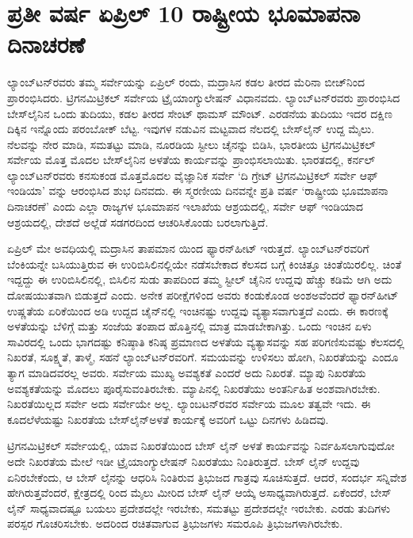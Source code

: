 
\chapter{ಪ್ರತೀ ವರ್ಷ ಏಪ್ರಿಲ್​ 10 ರಾಷ್ಟ್ರೀಯ ಭೂಮಾಪನಾ ದಿನಾಚರಣೆ}

ಲ್ಯಾಂಬ್​ಟನ್​ರವರು ತಮ್ಮ ಸರ್ವೇಯನ್ನು  ಏಪ್ರಿಲ್​  ರಂದು, ಮದ್ರಾಸಿನ ಕಡಲ ತೀರದ ಮೆರಿನಾ ಬೀಚ್​ನಿಂದ ಪ್ರಾರಂಭಿಸಿದರು. ಟ್ರಿಗನಮಿಟ್ರಿಕಲ್​ ಸರ್ವೇಯ ಟ್ರೈಯಾಂಗ್ಯುಲೇಷನ್​ ವಿಧಾನವದು. ಲ್ಯಾಂಬ್​ಟನ್​ರವರು ಪ್ರಾರಂಭಿಸಿದ ಬೇಸ್​ಲೈನಿನ ಒಂದು ತುದಿಯು, ಕಡಲ ತೀರದ ಸೇಂಟ್​ ಥಾಮಸ್​ ಮೌಂಟ್​. ಎರಡನೆಯ ತುದಿಯು ಇದರ ದಕ್ಷಿಣ ದಿಕ್ಕಿನ ಇನ್ನೊಂದು ಪರಂಬೋಕ್​ ಬೆಟ್ಟ. ಇವುಗಳ ನಡುವಿನ ಮಟ್ಟವಾದ ನೆಲದಲ್ಲಿ ಬೇಸ್​ಲೈನ್​ ಉದ್ದ  ಮೈಲು. ನೆಲವನ್ನು ನೇರ ಮಾಡಿ, ಸಮತಟ್ಟು ಮಾಡಿ, ನೂರಡಿಯ ಸ್ಟೀಲು ಚೈನನ್ನು ಬಿಡಿಸಿ, ಭಾರತೀಯ ಟ್ರಿಗನಮಿಟ್ರಿಕಲ್​ ಸರ್ವೇಯ ಮೊತ್ತ ಮೊದಲ ಬೇಸ್​ಲೈನಿನ ಅಳತೆಯ ಕಾರ್ಯವನ್ನು ಪ್ರಾಂಭಿಸಲಾಯಿತು. ಭಾರತದಲ್ಲಿ, ಕರ್ನಲ್​ ಲ್ಯಾಂಬ್​ಟನ್​ರವರು ಕನಸುಕಂಡ ಮೊತ್ತಮೊದಲ ವೈಜ್ಞಾನಿಕ ಸರ್ವೇ ‘ದಿ ಗ್ರೇಟ್​ ಟ್ರಿಗನಮಿಟ್ರಿಕಲ್​ ಸರ್ವೇ ಆಫ್​ ಇಂಡಿಯಾ’ ವನ್ನು ಆರಂಭಿಸಿದ ಶುಭ ದಿನವದು. ಈ ಸ್ಮರಣೀಯ ದಿನವನ್ನೇ ಪ್ರತಿ ವರ್ಷ ‘ರಾಷ್ಟ್ರೀಯ ಭೂಮಾಪನಾ ದಿನಾಚರಣೆ’ ಎಂದು ಎಲ್ಲಾ ರಾಜ್ಯಗಳ ಭೂಮಾಪನ ಇಲಾಖೆಯ ಆಶ್ರಯದಲ್ಲಿ, ಸರ್ವೇ ಆಫ್​ ಇಂಡಿಯಾದ ಆಶ್ರಯದಲ್ಲಿ, ದೇಶದೆ ಅಲ್ಲೆಡೆ ಸಡಗರದಿಂದ ಆಚರಿಸಿಕೊಂಡು ಬರಲಾಗುತ್ತಿದೆ.

ಏಪ್ರಿಲ್​ ಮೇ ಅವಧಿಯಲ್ಲಿ ಮದ್ರಾಸಿನ ತಾಪಮಾನ  ಯಿಂದ  ಫ್ಯಾರನ್​\break ಹೀಟ್​ ಇರುತ್ತದೆ. ಲ್ಯಾಂಬ್​ಟನ್​ರವರಿಗೆ ಬೆಂಕಿಯನ್ನೇ ಬಸಿಯುತ್ತಿರುವ ಈ ಉರಿಬಿಸಿಲಿನಲ್ಲಿಯೇ ನಡೆಸಬೇಕಾದ ಕೆಲಸದ ಬಗ್ಗೆ ಕಿಂಚಿತ್ತೂ ಚಿಂತೆಯಿರಲಿಲ್ಲ. ಚಿಂತೆ ಇದ್ದದ್ದು ಈ ಉರಿಬಿಸಿಲಿನಲ್ಲಿ, ಬಿಸಿಲಿನ ಸುಡು ತಾಪದಿಂದ ತಮ್ಮ ಸ್ಟೀಲ್​ ಚೈನಿನ ಉದ್ದವು ಹೆಚ್ಚು ಕಡಿಮೆ ಆಗಿ ಅದು ದೋಷಯುತವಾಗಿ ಬಿಡುತ್ತದೆ ಎಂದು. ಅನೇಕ ಪರೀಕ್ಷೆಗಳಿಂದ ಅವರು ಕಂಡುಕೊಂಡ ಅಂಶಅವೆಂದರೆ  ಫ್ಯಾರನ್​ಹೀಟ್​ ಉಷ್ಣತೆಯ ಏರಿಕೆಯಿಂದ  ಅಡಿ ಉದ್ದದ ಚೈನ್​ನಲ್ಲಿ  ಇಂಚಿನಷ್ಟು ಉದ್ದವು ವ್ಯತ್ಯಾಸವಾಗುತ್ತದೆ ಎಂದು. ಈ ಕಾರಣಕ್ಕೆ ಅಳತೆಯನ್ನು ಬೆಳಿಗ್ಗೆ ಮತ್ತು ಸಂಜೆಯ ತಂಪಾದ ಹೊತ್ತಿನಲ್ಲಿ ಮಾತ್ರ ಮಾಡಬೇಕಾಗಿತ್ತು. ಒಂದು ಇಂಚಿನ ಏಳು ಸಾವಿರದಲ್ಲಿ ಒಂದು ಭಾಗದಷ್ಟು ಕನಿಷ್ಠಾತಿ ಕನಿಷ್ಠ ಪ್ರಮಾಣದ ಅಳತೆಯ ವ್ಯತ್ಯಾಸವನ್ನು ಸಹ ಪರಿಗಣಿಸುವಷ್ಟು ಕೆಲಸದಲ್ಲಿ ನಿಖರತೆ, ಸೂಕ್ಷ್ಮತೆ, ತಾಳ್ಮೆ, ಸಹನೆ ಲ್ಯಾಂಬ್​ಟನ್​ರವರಿಗೆ. ಸಮಯವನ್ನು ಉಳಿಸಲು ಹೋಗಿ, ನಿಖರತೆಯನ್ನು ಎಂದೂ ತ್ಯಾಗ ಮಾಡಿದವರಲ್ಲ ಅವರು. ಸರ್ವೇಯ ಮುಖ್ಯ ಅವಶ್ಯಕತೆ ಎಂದರೆ ಅದು ನಿಖರತೆ. ಮ್ಯಾಪು ನಿಖರತೆಯ ಅವಶ್ಯಕತೆಯನ್ನು ಮೊದಲು ಪೂರೈಸುವಂತಿರಬೇಕು. ಮ್ಯಾಪಿನಲ್ಲಿ ನಿಖರತೆಯು ಅಂತರ್ನಿಹಿತ ಅಂಶವಾಗಿರಬೇಕು. ನಿಖರತೆಯಿಲ್ಲದ ಸರ್ವೇ ಅದು ಸರ್ವೇಯೇ ಅಲ್ಲ. ಲ್ಯಾಂಬಟನ್​ರವರ ಸರ್ವೇಯ ಮೂಲ ತತ್ವವೇ ಇದು. ಈ ಕೂದಲೆಳೆಯಷ್ಟು ನಿಖರತೆಯ ಬೇಸ್​ಲೈನ್​ ಅಳತೆ ಕಾರ್ಯಕ್ಕೆ ಅವರಿಗೆ ಒಟ್ಟು  ದಿನಗಳು ಹಿಡಿದವು.

ಟ್ರಿಗನಮಿಟ್ರಿಕಲ್​ ಸರ್ವೇಯಲ್ಲಿ, ಯಾವ ನಿಖರತೆಯಿಂದ ಬೇಸ್​ ಲೈನ್​ ಅಳತೆ ಕಾರ್ಯವನ್ನು ನಿರ್ವಹಿಸಲಾಗುವುದೋ ಅದೇ ನಿಖರತೆಯ ಮೇಲೆ ಇಡೀ ಟ್ರೈಯಾಂಗ್ಯುಲೇಷನ್​ ನಿಖರತೆಯು ನಿಂತಿರುತ್ತದೆ. ಬೇಸ್​ ಲೈನ್​ ಉದ್ದವು ಏನಿರಬೇಕೆಂದು, ಆ ಬೇಸ್​ ಲೈನನ್ನು ಆಧರಿಸಿ ನಿಂತಿರುವ ತ್ರಿಭುಜದ ಗಾತ್ರವು ಸೂಚಿಸುತ್ತದೆ. ಆದರೆ, ಸಂದರ್ಭ ಸನ್ನಿವೇಶ ಹೇಗಿರುತ್ತವೆಂದರೆ, ಕ್ಷೇತ್ರದಲ್ಲಿ  ರಿಂದ  ಮೈಲು ಮೀರಿದ ಬೇಸ್​ ಲೈನ್​ ಆಯ್ಕೆ ಅಸಾಧ್ಯವಾಗಿರುತ್ತದೆ. ಏಕೆಂದರೆ, ಬೇಸ್​ ಲೈನ್​ ಸಾಧ್ಯವಾದಷ್ಟೂ ಬಯಲು ಪ್ರದೇಶದಲ್ಲೇ ಇರಬೇಕು, ಸಮತಟ್ಟು ಪ್ರದೇಶದಲ್ಲೇ ಇರಬೇಕು. ಎರಡು ತುದಿಗಳು ಪರಸ್ಪರ ಗೊಚರಿಸಬೇಕು. ಅದರಿಂದ ರಚಿತವಾಗುವ ತ್ರಿಭುಜಗಳು ಸಮರೂಪಿ ತ್ರಿಭುಜಗಳಾಗಿರಬೇಕು.

